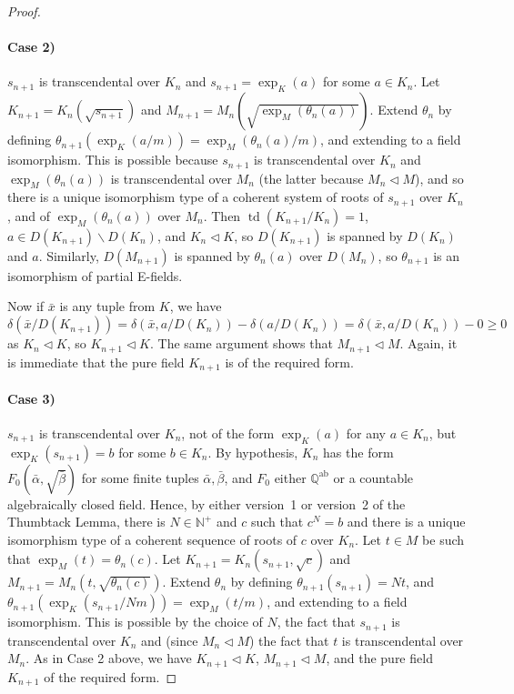 \documentclass[12pt]{amsart}
\theoremstyle{definition}
\begin{document}
\begin{proof}
\paragraph{Case 2)} $s_{n+1}$ is transcendental over $K_n$ and $s_{n+1} = \exp_K(a)$ for some $a \in K_n$. Let $K_{n+1} = K_n(\sqrt{s_{n+1}})$ and $M_{n+1} = M_n(\sqrt{\exp_M(\theta_n(a))})$. Extend $\theta_n$ by defining $\theta_{n+1}(\exp_K(a/m)) = \exp_M(\theta_n(a)/m)$, and extending to a field isomorphism. This is possible because $s_{n+1}$ is transcendental over $K_n$ and $\exp_M(\theta_n(a))$ is transcendental over $M_n$ (the latter because $M_n {\ensuremath{\lhd}} M$), and so there is a unique isomorphism type of a coherent system of roots of $s_{n+1}$ over $K_n$, and of $\exp_M(\theta_n(a))$ over $M_n$. Then $\operatorname{td}(K_{n+1}/K_n) = 1$, $a \in D(K_{n+1}) {\ensuremath{\smallsetminus}} D(K_n)$, and $K_n {\ensuremath{\lhd}} K$, so $D(K_{n+1})$ is spanned by $D(K_n)$ and $a$. Similarly, $D(M_{n+1})$ is spanned by $\theta_n(a)$ over $D(M_n)$, so $\theta_{n+1}$ is an isomorphism of partial E-fields.

Now if ${{\ensuremath{\bar{x}}}}$ is any tuple from $K$, we have 
\[\delta({{\ensuremath{\bar{x}}}}/D(K_{n+1})) = \delta({{\ensuremath{\bar{x}}}},a/D(K_n)) - \delta(a/D(K_n)) = \delta({{\ensuremath{\bar{x}}}},a/D(K_n)) - 0 {\ensuremath{\geqslant}} 0\]
as $K_n {\ensuremath{\lhd}} K$, so $K_{n+1} {\ensuremath{\lhd}} K$. The same argument shows that $M_{n+1} {\ensuremath{\lhd}} M$. Again, it is immediate that the pure field $K_{n+1}$ is of the required form.

\paragraph{Case 3)} $s_{n+1}$ is transcendental over $K_n$, not of the form $\exp_K(a)$ for any $a \in K_n$, but $\exp_K(s_{n+1}) = b$ for some $b \in K_n$. By hypothesis, $K_n$ has the form $F_0(\bar{\alpha},\sqrt{\bar{\beta}})$ for some finite tuples $\bar{\alpha},\bar{\beta}$, and $F_0$ either ${{\ensuremath{\mathbb{Q}}}^{\mathrm{ab}}}$ or a countable algebraically closed field. Hence, by either version~1 or version~2 of the Thumbtack Lemma, there is $N \in {\ensuremath{\mathbb{N}}}^+$ and $c$ such that $c^N = b$ and there is a unique isomorphism type of a coherent sequence of roots of $c$ over $K_n$. Let $t \in M$ be such that $\exp_M(t) = \theta_n(c)$. Let $K_{n+1} = K_n(s_{n+1},\sqrt{c})$ and $M_{n+1} = M_n(t, \sqrt{\theta_n(c)})$. Extend $\theta_n$ by defining $\theta_{n+1}(s_{n+1}) = Nt$, and $\theta_{n+1}(\exp_K(s_{n+1}/Nm)) = \exp_M(t/m)$, and extending to a field isomorphism. This is possible by the choice of $N$, the fact that $s_{n+1}$ is transcendental over $K_n$ and (since $M_n {\ensuremath{\lhd}} M$) the fact that $t$ is transcendental over $M_n$. As in Case 2 above, we have $K_{n+1} {\ensuremath{\lhd}} K$, $M_{n+1} {\ensuremath{\lhd}} M$, and the pure field $K_{n+1}$ of the required form.


\end{proof}
\end{document}
